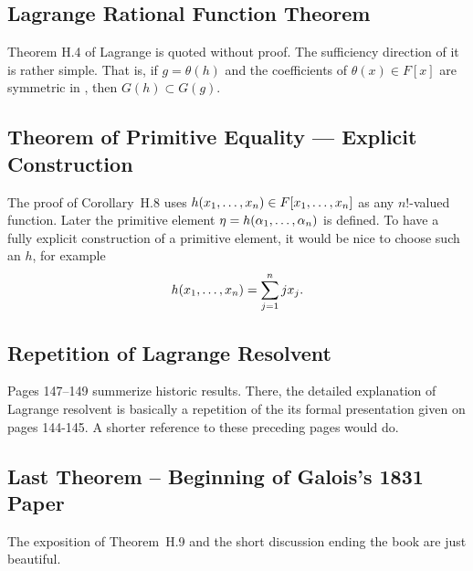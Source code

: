 \subsection{Lagrange Rational Function Theorem}

Theorem H.4 of Lagrange is quoted without proof.
The sufficiency direction of it is rather simple.
That is, if \(g=\theta(h)\) and the coefficients
of \(\theta(x)\in F[x]\) are symmetric in \seqxn, then
\(G(h)\subset G(g)\).

\subsection{Theorem of Primitive Equality --- Explicit Construction}

The proof of Corollary~H.8 uses \(h(x_1,\ldots,x_{n})\in F[x_1,\ldots,x_{n}]\)
as any \(n!\)-valued function. Later the primitive element
\(\eta = h(\alpha_1,\ldots,\alpha_{n})\) is defined.
To have a fully explicit construction of a primitive element,
it would be nice to choose such an $h$, for example
\begin{equation*}
h(x_1,\ldots,x_{n}) = \sum_{j=1}^n jx_j .
\end{equation*}

\subsection{Repetition of Lagrange Resolvent}

Pages 147--149 summerize historic results.
There, the detailed explanation of Lagrange resolvent is
basically a repetition of the its formal presentation
given on pages 144-145. A shorter reference to these preceding
pages would do.

\subsection{Last Theorem -- Beginning of Galois's 1831 Paper}

The exposition of Theorem~H.9 and the short discussion ending the book
are just beautiful.


% 




